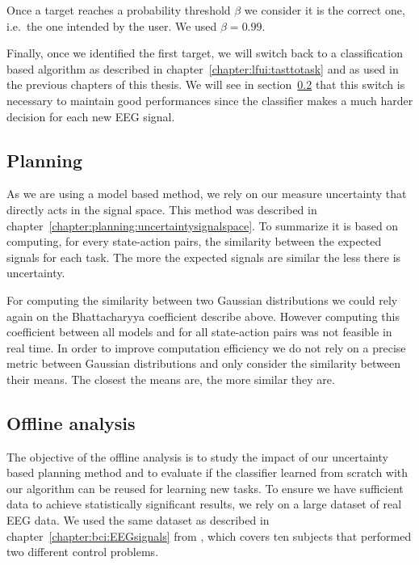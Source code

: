 Once a target reaches a probability threshold $\beta$ we consider it is the correct one, i.e.\ the one intended by the user. We used $\beta = 0.99$.

Finally, once we identified the first target, we will switch back to a classification based algorithm as described in chapter~\ref{chapter:lfui:tasttotask} and as used in the previous chapters of this thesis. We will see in section~\ref{chapter:limitations:overlap:offline} that this switch is necessary to maintain good performances since the classifier makes a much harder decision for each new EEG signal.

\subsection{Planning}

As we are using a model based method, we rely on our measure uncertainty that directly acts in the signal space. This method was described in chapter~\ref{chapter:planning:uncertaintysignalspace}. To summarize it is based on computing, for every state-action pairs, the similarity between the expected signals for each task. The more the expected signals are similar the less there is uncertainty.

For computing the similarity between two Gaussian distributions we could rely again on the Bhattacharyya coefficient describe above. However computing this coefficient between all models and for all state-action pairs was not feasible in real time. In order to improve computation efficiency we do not rely on a precise metric between Gaussian distributions and only consider the similarity between their means. The closest the means are, the more similar they are.

\subsection{Offline analysis}
\label{chapter:limitations:overlap:offline}

The objective of the offline analysis is to study the impact of our uncertainty based planning method and to evaluate if the classifier learned from scratch with our algorithm can be reused for learning new tasks. To ensure we have sufficient data to achieve statistically significant results, we rely on a large dataset of real EEG data. We used the same dataset as described in chapter~\ref{chapter:bci:EEGsignals} from \cite{iturrate2013task}, which covers ten subjects that performed two different control problems.

